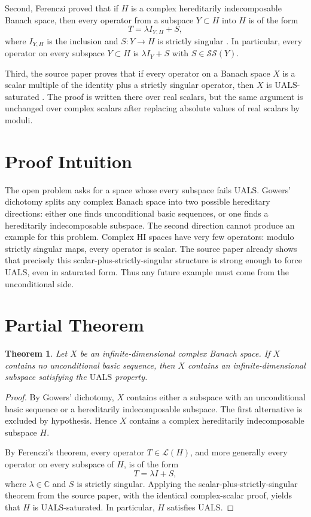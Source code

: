 \documentclass[11pt]{article}
\newtheorem{theorem}{Theorem}
\newcommand{\UALS}{\mathrm{UALS}}
\newcommand{\SSing}{\mathcal{SS}}
\newcommand{\LL}{\mathcal{L}}
\begin{document}
Second, Ferenczi proved that if \(H\) is a complex hereditarily indecomposable
Banach space, then every operator from a subspace \(Y\subset H\) into \(H\) is
of the form
\[
  T=\lambda I_{Y,H}+S,
\]
where \(I_{Y,H}\) is the inclusion and \(S:Y\to H\) is strictly singular
\cite{Ferenczi}. In particular, every operator on every subspace \(Y\subset H\)
is \(\lambda I_Y+S\) with \(S\in \SSing(Y)\).

Third, the source paper proves that if every operator on a Banach space \(X\)
is a scalar multiple of the identity plus a strictly singular operator, then
\(X\) is \(\UALS\)-saturated \cite[Section 5.1, p. 24]{AGLM}. The proof is
written there over real scalars, but the same argument is unchanged over
complex scalars after replacing absolute values of real scalars by moduli.

\section*{Proof Intuition}

The open problem asks for a space whose every subspace fails \(\UALS\). Gowers'
dichotomy splits any complex Banach space into two possible hereditary
directions: either one finds unconditional basic sequences, or one finds a
hereditarily indecomposable subspace. The second direction cannot produce an
example for this problem. Complex HI spaces have very few operators: modulo
strictly singular maps, every operator is scalar. The source paper already
shows that precisely this scalar-plus-strictly-singular structure is strong
enough to force \(\UALS\), even in saturated form. Thus any future example must
come from the unconditional side.

\section*{Partial Theorem}

\begin{theorem}
Let \(X\) be an infinite-dimensional complex Banach space. If \(X\) contains no
unconditional basic sequence, then \(X\) contains an infinite-dimensional
subspace satisfying the \(\UALS\) property.
\end{theorem}

\begin{proof}
By Gowers' dichotomy, \(X\) contains either a subspace with an unconditional
basic sequence or a hereditarily indecomposable subspace. The first alternative
is excluded by hypothesis. Hence \(X\) contains a complex hereditarily
indecomposable subspace \(H\).

By Ferenczi's theorem, every operator \(T\in\LL(H)\), and more generally every
operator on every subspace of \(H\), is of the form
\[
  T=\lambda I+S,
\]
where \(\lambda\in\mathbb C\) and \(S\) is strictly singular. Applying the
scalar-plus-strictly-singular theorem from the source paper, with the identical
complex-scalar proof, yields that \(H\) is \(\UALS\)-saturated. In particular,
\(H\) satisfies \(\UALS\).
\end{proof}
\end{document}
